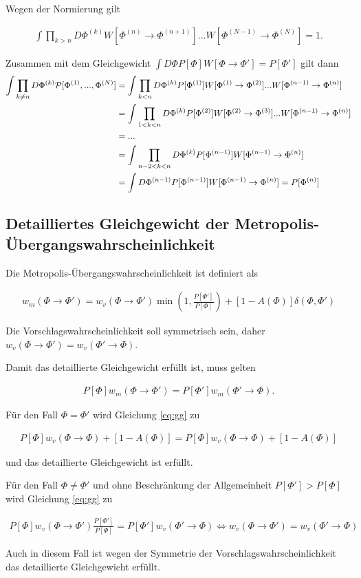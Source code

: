 \documentclass[10pt,a4paper]{article}
\begin{document}
Wegen der Normierung gilt

 \begin{align*}
	\int \prod_{k > n} D\Phi^{(k)} W[\Phi^{(n)}\to \Phi^{(n+1)}]...W[\Phi^{(N-1)}\to \Phi^{(N)}]=1.
 \end{align*}

Zusammen mit dem Gleichgewicht $\int D\Phi P[\Phi] W[\Phi\to \Phi'] = P[\Phi']$ gilt dann
 \begin{align*}
      \int \prod_{k\neq n} D\Phi^{(k)} {\cal P}[\Phi^{(1)},...,\Phi^{(N)}] &= \int \prod_{k <  n} D\Phi^{(k)}P[\Phi^{(1)}] W[\Phi^{(1)}\to \Phi^{(2)}]...W[\Phi^{(n-1)}\to \Phi^{(n)}] \\
&=\int \prod_{1 < k <  n} D\Phi^{(k)}P[\Phi^{(2)}] W[\Phi^{(2)}\to \Phi^{(3)}]...W[\Phi^{(n-1)}\to \Phi^{(n)}]\\
&= ...\\
&=\int \prod_{n-2 < k <  n} D\Phi^{(k)}P[\Phi^{(n-1)}] W[\Phi^{(n-1)}\to \Phi^{(n)}] \\
&=\int  D\Phi^{(n-1)}P[\Phi^{(n-1)}] W[\Phi^{(n-1)}\to \Phi^{(n)}] = P[\Phi^{(n)}]
 \end{align*}

\subsection{Detailliertes Gleichgewicht der Metropolis-Übergangswahrscheinlichkeit}
Die Metropolis-Übergangswahrscheinlichkeit ist definiert als

\begin{align*}
	w_m(\Phi\to\Phi') = w_v(\Phi\to\Phi') \min \left(1,\frac{P[\Phi']}{P[\Phi]}\right) + [1-A(\Phi)]\delta(\Phi,\Phi')
\end{align*}

Die Vorschlagswahrscheinlichkeit soll symmetrisch sein, daher $w_v(\Phi\to\Phi')=w_v(\Phi'\to\Phi)$.

Damit das detaillierte Gleichgewicht erfüllt ist, muss gelten

\begin{align}\label{eq:gg}
P[\Phi] w_m(\Phi\to\Phi')= P[\Phi']w_m(\Phi'\to\Phi).
\end{align}

Für den Fall $\Phi = \Phi'$ wird Gleichung \ref{eq:gg} zu

\begin{align*}
	P[\Phi] w_v(\Phi\to\Phi) + [1-A(\Phi)] = P[\Phi] w_v(\Phi\to\Phi) + [1-A(\Phi)]
\end{align*}

und das detaillierte Gleichgewicht ist erfüllt.

Für den Fall $\Phi \neq \Phi'$ und ohne Beschränkung der Allgemeinheit $P[\Phi']>P[\Phi]$ wird Gleichung \ref{eq:gg} zu

\begin{align*}
		P[\Phi] w_v(\Phi\to\Phi') \frac{P[\Phi']}{P[\Phi]} = P[\Phi'] w_v(\Phi'\to\Phi)
		\Leftrightarrow w_v(\Phi\to\Phi')=w_v(\Phi'\to\Phi)
\end{align*}

Auch in diesem Fall ist wegen der Symmetrie der Vorschlagswahrscheinlichkeit das detaillierte Gleichgewicht erfüllt.
\end{document}
